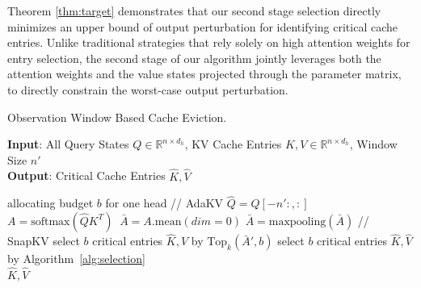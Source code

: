 Theorem  \ref{thm:target}  demonstrates that our second stage selection directly minimizes an upper bound of output perturbation for identifying critical cache entries. Unlike traditional strategies that rely solely on high attention weights for entry selection, the second stage of our algorithm jointly leverages both the attention weights and the value states projected through the parameter matrix, to directly constrain the worst-case output perturbation.



\begin{algorithm}[tb]
	\small
	\caption{Observation Window Based Cache Eviction.}
	\label{alg:cache_eviction}
	\textbf{Input}: All Query States $Q \in \mathbb{R}^{n \times d_{h}}$, KV Cache Entries $K,V  \in \mathbb{R}^{n \times d_{h}}$, Window Size $n'$\\	%
	\textbf{Output}: Critical Cache Entries $\hat{K},\hat{V}$
	\begin{algorithmic}[1] %
		\STATE  allocating budget $b$ for one head   //  AdaKV \cite{ada}
		\STATE  $\hat{Q} = Q[-n':,:] \:$ 	%
		\STATE  $A = \text{softmax}(\hat{Q}K^T) \:$
		\STATE $\bar{A} = A.\text{mean}(dim = 0)$
		\STATE $\bar{A} =  \text{maxpooling}(\bar{A}) $ // SnapKV \cite{SnapKV}
		\STATE  select $b$ critical entries $\hat{K},\hat{V}$ by $\text{Top}_k(\bar{A}', b)$
		\STATE select $b$ critical entries $\hat{K},\hat{V}$ by  Algorithm~\ref{alg:selection}
		\ENDIF\\
		\RETURN $\hat{K},\hat{V}$
	\end{algorithmic}
\end{algorithm}



